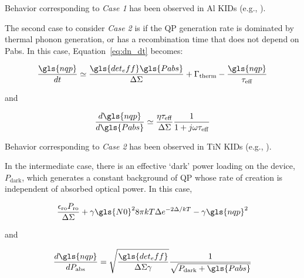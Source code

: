 Behavior corresponding to \textit{Case 1} has been observed in Al KIDs (e.g., \citet{de2014quasiparticle,flanigan2016photon,mauskopf2014photon}).

The second case to consider \textit{Case 2} is if the QP generation rate is dominated by thermal phonon generation, or has a recombination time that does not depend on \gls{Pabs}. In this case, Equation~\ref{eq:dn_dt} becomes:

\begin{equation}
    \frac{\gls{nqp}}{dt} \simeq \frac{\gls{det_eff} \gls{Pabs}}{\Delta \Sigma} + \Gamma_{\mathrm{therm}} - \frac{\gls{nqp}}{\tau_{\mathrm{eff}}}
\end{equation}

and

\begin{equation}\label{eq:case2}
\frac{d\gls{nqp}}{d\gls{Pabs}} \simeq \frac{\eta\tau_{\mathrm{eff}}}{\Delta\Sigma}\frac{1}{1 + j\omega\tau_{\mathrm{eff}}}
\end{equation}

Behavior corresponding to \textit{Case 2} has been observed in TiN KIDs (e.g., \citet{catalano2014performance,hubmayr2015photon,hailey2016low}).

In the intermediate case, there is an effective `dark' power loading on the device, $P_{\mathrm{dark}}$, which generates a constant background of QP whose rate of creation is independent of absorbed optical power. In this case,

\begin{equation}
    \frac{\epsilon_{\mathrm{ro}} P_{\mathrm{ro}}}{\Delta \Sigma} + \gamma \gls{N0}^{2} 8\pi k T \Delta e^{-2 \Delta / kT} - \gamma\gls{nqp}^{2}
\end{equation}

and

\begin{equation}
  \frac{d\gls{nqp}}{dP_{\mathrm{abs}}} = \sqrt{\frac{\gls{det_eff}}{\Delta \Sigma \gamma}}\frac{1}{\sqrt{P_{\mathrm{dark}} + \gls{Pabs}}}
\end{equation}

